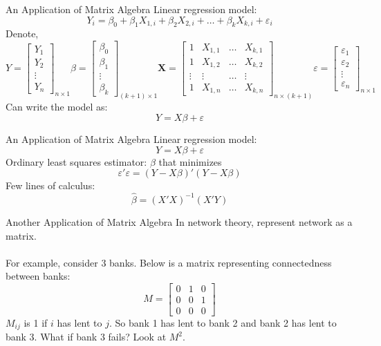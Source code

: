 \documentclass{./../../Latex/teaching_slides}
\begin{document}
\begin{frame}{An Application of Matrix Algebra}
Linear regression model:
  $$ Y_i = \beta_0 + \beta_1 X_{1,i} + \beta_2 X_{2,i} + \hdots + \beta_{k} X_{k,i}  + \varepsilon_i $$ 
Denote, \small 
$$ Y  = \begin{bmatrix} Y_1 \\ Y_2 \\ \vdots \\ Y_n  \end{bmatrix}_{n \times 1}    
  \beta  = \begin{bmatrix} \beta_0 \\ \beta_1 \\ \vdots \\ \beta_{k}  \end{bmatrix}_{(k+1) \times 1}  
  \boldsymbol{X} = \begin{bmatrix} 
  	1 & X_{1,1} & \hdots & X_{k,1} \\ 
  	1 & X_{1,2} & \hdots  & X_{k,2} \\
   \vdots & \vdots & \hdots &  \vdots \\ 
   1 & X_{1,n}  & \hdots & X_{k,n} \end{bmatrix}_{n \times (k+1)} 
   \varepsilon = \begin{bmatrix} \varepsilon_1 \\ \varepsilon_2 \\ \vdots \\ \varepsilon_n  \end{bmatrix}_{n \times 1}$$
   \normalsize
   Can write the model as: $$ Y = X\beta + \varepsilon $$
\end{frame}

\begin{frame}{An Application of Matrix Algebra}
Linear regression model:
$$ Y = X\beta + \varepsilon $$
Ordinary least squares estimator: $\beta$ that minimizes
$$ \varepsilon'\varepsilon = (Y-X\beta)'(Y-X\beta) $$
Few lines of calculus: 
$$ \hat{\beta} = (X'X)^{-1}(X'Y) $$
\end{frame}

\begin{frame}{Another Application of Matrix Algebra}
In network theory, represent network as a matrix. \\~\\
For example, consider 3 banks. Below is a matrix representing connectedness between banks:
$$ M  = \begin{bmatrix} 
0 & 1 & 0 \\ 
0 & 0 & 1 \\
0 & 0 & 0 
\end{bmatrix} $$
$M_{ij}$ is 1 if $i$ has lent to $j$. So bank 1 has lent to bank 2 and bank 2 has lent to bank 3. What if bank 3 fails? Look at $M^2$.
\end{frame}
\end{document}
